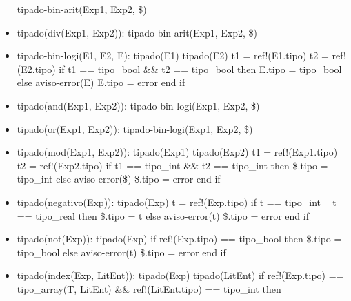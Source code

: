 \documentclass[11pt]{article}
\begin{document}
\begin{itemize}
                \subitem tipado-bin-arit(Exp1, Exp2, \$)
            \item tipado(div(Exp1, Exp2)): 
                \subitem tipado-bin-arit(Exp1, Exp2, \$)
            \item tipado-bin-logi(E1, E2, E): 
                \subitem tipado(E1) 
                \subitem tipado(E2) 
                \subitem t1 = ref!(E1.tipo) 
                \subitem t2 = ref!(E2.tipo) 
                \subitem if t1 == tipo\_bool \&\&  t2 == tipo\_bool then
                    \subsubitem E.tipo = tipo\_bool
                \subitem else
                    \subsubitem aviso-error(E)
                    \subsubitem E.tipo = error
                \subitem end if
            \item tipado(and(Exp1, Exp2)): 
                \subitem tipado-bin-logi(Exp1, Exp2, \$)
            \item tipado(or(Exp1, Exp2)): 
                \subitem tipado-bin-logi(Exp1, Exp2, \$)
            \item tipado(mod(Exp1, Exp2)): 
                \subitem tipado(Exp1) 
                \subitem tipado(Exp2) 
                \subitem t1 = ref!(Exp1.tipo) 
                \subitem t2 = ref!(Exp2.tipo) 
                \subitem if t1 == tipo\_int \&\&  t2 == tipo\_int then
                    \subsubitem \$.tipo = tipo\_int
                \subitem else 
                    \subsubitem aviso-error(\$)
                    \subsubitem \$.tipo = error
                \subitem end if
            \item tipado(negativo(Exp)): 
                \subitem tipado(Exp) 
                \subitem t = ref!(Exp.tipo) 
                \subitem if t == tipo\_int $\vert \vert$ t == tipo\_real then
                    \subsubitem \$.tipo = t
                \subitem else 
                    \subsubitem aviso-error(t)
                    \subsubitem \$.tipo = error
                \subitem end if
            \item tipado(not(Exp)): 
                \subitem tipado(Exp) 
                \subitem if ref!(Exp.tipo) == tipo\_bool then
                    \subsubitem \$.tipo = tipo\_bool
                \subitem else 
                    \subsubitem aviso-error(t)
                    \subsubitem \$.tipo = error
                \subitem end if
            \item tipado(index(Exp, LitEnt)): 
                \subitem tipado(Exp) 
                \subitem tipado(LitEnt) 
                \subitem if ref!(Exp.tipo) == tipo\_array(T, LitEnt) \&\&  ref!(LitEnt.tipo) == tipo\_int then

\end{itemize}
\end{document}
